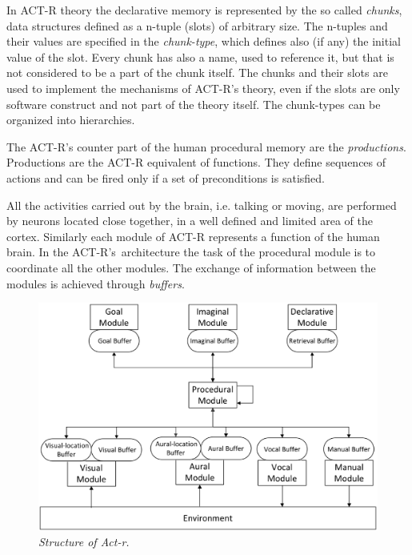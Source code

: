 	In \mbox{ACT-R} theory the declarative memory is represented by the so called \emph{chunks}, data structures defined as a n-tuple (slots) of arbitrary size. The n-tuples and their values are specified in the \emph{chunk-type}, which defines also (if any) the initial value of the slot. Every chunk has also a name, used to reference it, but that is not considered to be a part of the chunk itself. The chunks and their slots are used to implement the mechanisms of \mbox{ACT-R's} theory, even if the slots are only software construct and not part of the theory itself. The chunk-types can be organized into hierarchies.

	The \mbox{ACT-R's} counter part of the human procedural memory are the \emph{productions}. Productions are the \mbox{ACT-R} equivalent of functions. They define sequences of actions and can be fired only if a set of preconditions is satisfied.  

	All the activities carried out by the brain, i.e. talking or moving, are performed by neurons located close together, in a well defined and limited area of the cortex. Similarly each module of \mbox{ACT-R} represents a function of the human brain. In the \mbox{ACT-R's architecture} the task of the procedural module is to coordinate all the other modules. The exchange of information between the modules is achieved through \emph{buffers}.

	\begin{figure}[h]
	  \begin{center} 
	    \includegraphics[scale=0.25]{images/ch_01/actr.eps}
	  \end{center} 
	  \caption{\textit{Structure of Act-r.}}  
	  \label{fig:modulesActr}
	\end{figure}
	
